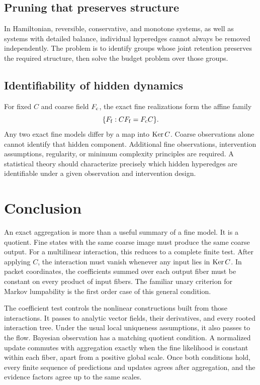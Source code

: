 \subsection{Pruning that preserves structure}
In Hamiltonian, reversible, conservative, and monotone systems, as well as systems with detailed balance, individual hyperedges cannot always be removed independently.  The problem is to identify groups whose joint retention preserves the required structure, then solve the budget problem over those groups.

\subsection{Identifiability of hidden dynamics}
For fixed $C$ and coarse field $F_{\mathrm c}$, the exact fine realizations form the affine family
\[
  \{F_{\mathrm f}:CF_{\mathrm f}=F_{\mathrm c}C\}.
\]
Any two exact fine models differ by a map into $\operatorname{Ker} C$.  Coarse observations alone cannot identify that hidden component.  Additional fine observations, intervention assumptions, regularity, or minimum complexity principles are required.  A statistical theory should characterize precisely which hidden hyperedges are identifiable under a given observation and intervention design.

\section{Conclusion}
An exact aggregation is more than a useful summary of a fine model.  It is a quotient.  Fine states with the same coarse image must produce the same coarse output.  For a multilinear interaction, this reduces to a complete finite test.  After applying $C$, the interaction must vanish whenever any input lies in $\operatorname{Ker} C$.  In packet coordinates, the coefficients summed over each output fiber must be constant on every product of input fibers.  The familiar unary criterion for Markov lumpability is the first order case of this general condition.

The coefficient test controls the nonlinear constructions built from those interactions.  It passes to analytic vector fields, their derivatives, and every rooted interaction tree.  Under the usual local uniqueness assumptions, it also passes to the flow.  Bayesian observation has a matching quotient condition.  A normalized update commutes with aggregation exactly when the fine likelihood is constant within each fiber, apart from a positive global scale.  Once both conditions hold, every finite sequence of predictions and updates agrees after aggregation, and the evidence factors agree up to the same scales.

